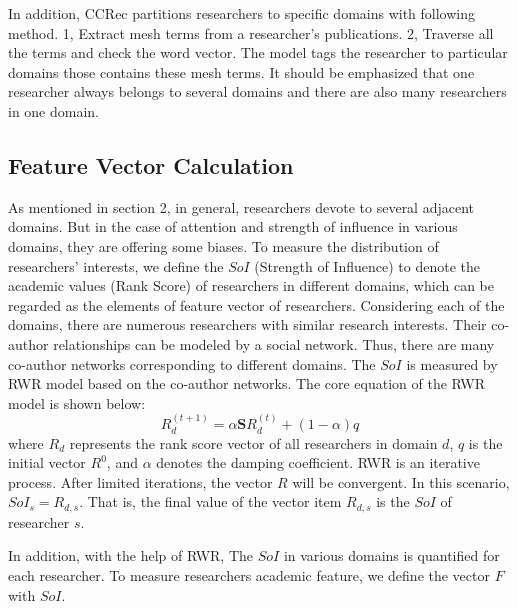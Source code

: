 \documentclass{acm_proc_article-sp}
\begin{document}
In addition, CCRec partitions researchers to specific domains with following method. 1, Extract mesh terms from a researcher's publications. 2, Traverse all the terms and check the word vector. The model tags the researcher to particular domains those contains these mesh terms. It should be emphasized that one researcher always belongs to several domains and there are also many researchers in one domain.

\subsection{Feature Vector Calculation}
As mentioned in section 2, in general, researchers devote to several adjacent domains. But in the case of attention and strength of influence in various domains, they are offering some biases. To measure the distribution of researchers' interests, we define the $SoI$ (Strength of Influence) to denote the academic values (Rank Score) of researchers in different domains, which can be regarded as the elements of feature vector of researchers. Considering each of the domains, there are numerous researchers with similar research interests. Their co-author relationships can be modeled by a social network. Thus, there are many co-author networks corresponding to different domains. The $SoI$ is measured by RWR model based on the co-author networks. The core equation of the RWR model is shown below:
\begin{equation}
R_{d}^{(t+1)}=\alpha \mathbf{S}R_{d}^{(t)}+(1-\alpha)q
\end{equation}
where $R_{d}$ represents the rank score vector of all researchers in domain $d$, $q$ is the initial vector $R^0$, and $\alpha$ denotes the damping coefficient. RWR is an iterative process. After limited iterations, the vector $R$ will be convergent. In this scenario, $SoI_{s}=R_{d,s}$. That is, the final value of the vector item $R_{d,s}$ is the $SoI$ of researcher $s$.


In addition, with the help of RWR, The $SoI$ in various domains is quantified for each researcher. To measure researchers academic feature, we define the vector $F$ with $SoI$.
\end{document}
